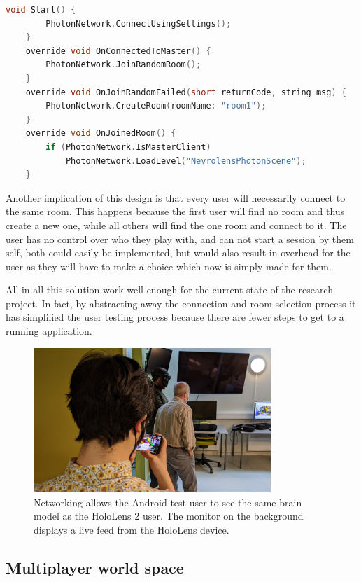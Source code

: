 \begin{lstlisting}[language=c, label={item:photonconnect}, caption={The connect process in a Unity \texttt{MonoBehaviour} written in C\#. }]
    void Start() {
        PhotonNetwork.ConnectUsingSettings();
    }
    override void OnConnectedToMaster() {
        PhotonNetwork.JoinRandomRoom(); 
    }
    override void OnJoinRandomFailed(short returnCode, string msg) {
        PhotonNetwork.CreateRoom(roomName: "room1"); 
    }
    override void OnJoinedRoom() {
        if (PhotonNetwork.IsMasterClient)
            PhotonNetwork.LoadLevel("NevrolensPhotonScene");
    }
\end{lstlisting}

Another implication of this design is that every user will necessarily connect to the same room. This happens because the first user will find no room and thus create a new one, while all others will find the one room and connect to it. The user has no control over who they play with, and can not start a session by them self, both could easily be implemented, but would also result in overhead for the user as they will have to make a choice which now is simply made for them.

All in all this solution work well enough for the current state of the research project. In fact, by abstracting away the connection and room selection process it has simplified the user testing process because there are fewer steps to get to a running application. 


\begin{figure}
    \centering
    \includegraphics[width=0.8\textwidth]{fig/nevrolensandroidtester.jpg}
    \caption{Networking allows the Android test user to see the same brain model as the HoloLens 2 user. The monitor on the background displays a live feed from the HoloLens device.}
\end{figure}

\subsection*{Multiplayer world space}\label{chap:multiplayerworldspace}


